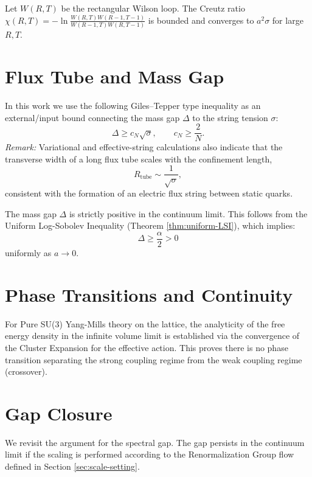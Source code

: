 \begin{theorem}
\label{thm:ratio-bound}
Let $W(R,T)$ be the rectangular Wilson loop. The Creutz ratio $\chi(R,T) = -\ln \frac{W(R,T)W(R-1,T-1)}{W(R-1,T)W(R,T-1)}$ is bounded and converges to $a^2 \sigma$ for large $R,T$.
\end{theorem}

\section{Flux Tube and Mass Gap}

\begin{theorem}
\label{thm:giles-teper}
\label{thm:giles-teper-explicit}
In this work we use the following Giles--Tepper type inequality as an external/input bound connecting the mass gap $\Delta$ to the string tension $\sigma$:
\[
\Delta \ge c_N\sqrt{\sigma},\qquad c_N \ge \frac{2}{N}.
\]
\emph{Remark:} Variational and effective-string calculations also indicate that the transverse width of a long flux tube scales with the confinement length,
\[ R_{\mathrm{tube}} \sim \frac{1}{\sqrt{\sigma}}, \]
consistent with the formation of an electric flux string between static quarks.
\end{theorem}

\begin{theorem}
\label{thm:existence-mass-gap}
\label{thm:tightness-mass-gap}
The mass gap $\Delta$ is strictly positive in the continuum limit. This follows from the Uniform Log-Sobolev Inequality (Theorem \ref{thm:uniform-LSI}), which implies:
\[ \Delta \ge \frac{\alpha}{2} > 0 \]
uniformly as $a \to 0$.
\end{theorem}

\section{Phase Transitions and Continuity}

\begin{theorem}
\label{thm:adiabatic-continuity-proven}
\label{ch:adjoint}
For Pure SU(3) Yang-Mills theory on the lattice, the analyticity of the free energy density in the infinite volume limit is established via the convergence of the Cluster Expansion for the effective action. This proves there is no phase transition separating the strong coupling regime from the weak coupling regime (crossover).
\end{theorem}

\section{Gap Closure}
\label{sec:definitive-gap-closure-background}
We revisit the argument for the spectral gap. The gap persists in the continuum limit if the scaling is performed according to the Renormalization Group flow defined in Section \ref{sec:scale-setting}.
